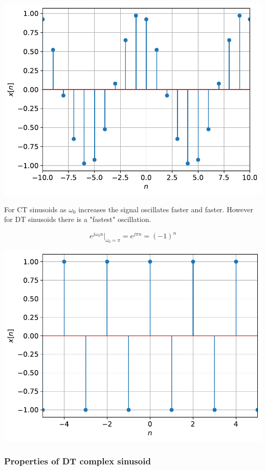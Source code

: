 \begin{center}
\includegraphics[scale=0.6]{graphics/dtsinusoid.pdf}
\end{center}

For CT sinusoids as $\omega_0$ increases the signal oscillates faster and faster. However for DT sinusoids there is a "fastest" oscillation.

\[
e^{j\omega_0 n}\rvert_{\omega_0 = \pi} = e^{j\pi n} = (-1)^n
\]

\includegraphics[scale=0.5]{graphics/dtfastsin.pdf}

\subsubsection{Properties of DT complex sinusoid}

